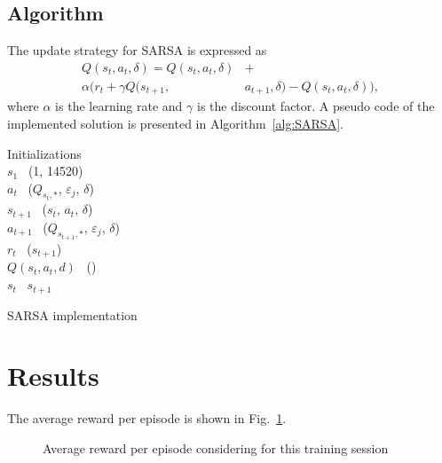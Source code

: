 \documentclass{IEEEtran}
\begin{document}
\subsection{Algorithm}
The update strategy for SARSA is expressed as
\begin{equation}
    \begin{align}
        Q(s_t, a_t, \delta) = Q(s_t, a_t, \delta) &+ \\ \alpha (r_t + \gamma Q(s_{t+1},& a_{t+1}, \delta) - Q(s_t, a_t, \delta)),
    \end{align}
\end{equation}
where $\alpha$ is the learning rate and $\gamma$ is the discount factor.
A pseudo code of the implemented solution is presented in Algorithm~\ref{alg:SARSA}.
\begin{algorithm}[h]
        Initializations \\
     {%
        $s_1$ \leftarrow~\random(1, 14520) \\
         {%
             {%
                $a_t$ \leftarrow~\chooseAction($Q_{s_t,*}$, $\varepsilon_j$, $\delta$) \\
                $s_{t+1}$ \leftarrow~\takeAction($s_t$, $a_t$, $\delta$) \\
                $a_{t+1}$ \leftarrow~\chooseAction($Q_{s_{t+1},*}$, $\varepsilon_j$, $\delta$) \\
                $r_t$ \leftarrow~\computeReward($s_{t+1}$) \\
                $Q(s_t, a_t, d)$ \leftarrow~\updateQ()\\
                $s_t$ \leftarrow~$s_{t+1}$ \\
            }
        }
    }
\caption{SARSA implementation}\label{alg:SARSA}
\end{algorithm}
\section{Results}
The average reward per episode is shown in Fig.~\ref{fig:results}.
\begin{figure}[t!]
    \resizebox{\columnwidth}{!}{}
    \caption{Average reward per episode considering for this training session}\label{fig:results}
\end{figure}
\end{document}
